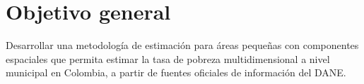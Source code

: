 \section{Objetivo general}
Desarrollar una metodología de estimación para áreas pequeñas con componentes espaciales que permita estimar la tasa de pobreza multidimensional a nivel municipal en Colombia, a partir de fuentes oficiales de información del DANE.
